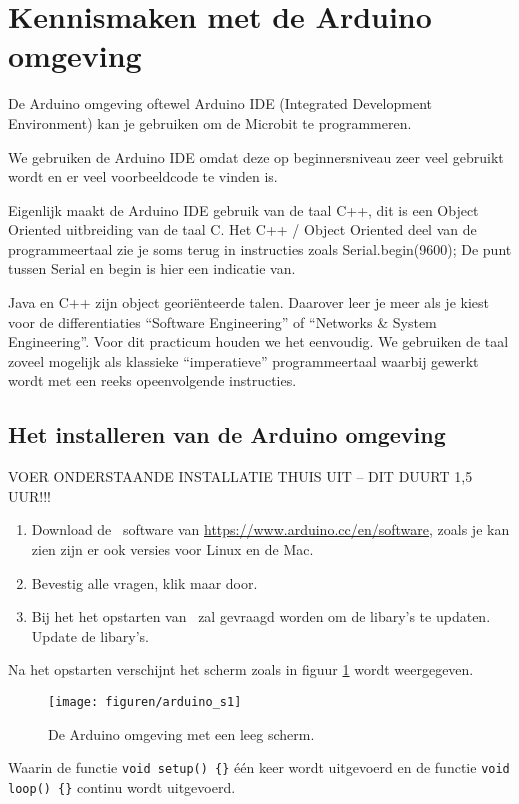 
\section{Kennismaken met de Arduino omgeving}

De Arduino omgeving oftewel Arduino IDE (Integrated Development Environment) kan je gebruiken om de Microbit te programmeren. 

We gebruiken de Arduino IDE omdat deze op beginnersniveau zeer veel gebruikt wordt en er veel voorbeeldcode te vinden is.
 
Eigenlijk maakt de Arduino IDE gebruik van de taal C++, dit is een Object Oriented uitbreiding van de taal C. Het C++ / Object Oriented deel van de programmeertaal zie je soms terug in instructies zoals Serial.begin(9600); De punt tussen Serial en begin is hier een indicatie van.

Java en C++ zijn object georiënteerde talen. Daarover leer je meer als je kiest voor de differentiaties “Software Engineering” of “Networks \& System Engineering”. Voor dit practicum houden we het eenvoudig. We gebruiken de taal zoveel mogelijk als klassieke “imperatieve” programmeertaal waarbij gewerkt wordt met een reeks opeenvolgende instructies.



\subsection{Het installeren van de Arduino omgeving}\label{sec:insArd}

VOER ONDERSTAANDE INSTALLATIE THUIS UIT – DIT DUURT 1,5 UUR!!!

\begin{enumerate}
	\item Download de \ardIDE ~software van \href{https://www.arduino.cc/en/software}{https://www.arduino.cc/en/software}, zoals je kan zien zijn er ook versies voor Linux en de Mac.
	\item  Bevestig alle vragen, klik maar door.
	\item Bij het het opstarten van \ardIDE ~zal gevraagd worden om de libary's te updaten. Update de libary's.
\end{enumerate}
Na het opstarten verschijnt het scherm zoals in figuur \ref{fig:arduino_s1} wordt weergegeven.

\begin{figure}[h!]
	\captionsetup{justification=centering}
	\texttt{[image: figuren/arduino\_s1]}
	\centering
	\caption{De Arduino omgeving met een leeg scherm.}
	\label{fig:arduino_s1}
\end{figure}
Waarin de functie \lstinline |void setup() {}| één keer wordt uitgevoerd en de functie \lstinline |void loop() {}| continu wordt uitgevoerd.


